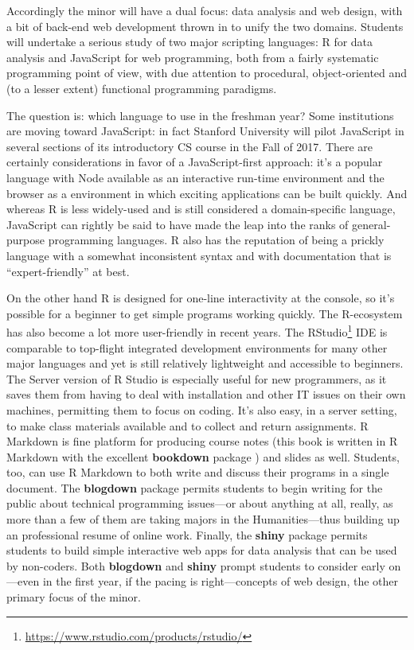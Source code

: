\documentclass[]{book}
\let\rmarkdownfootnote\footnote%
\def\footnote{\protect\rmarkdownfootnote}
\renewcommand{\href}[2]{#2\footnote{\url{#1}}}
\renewcommand{\href}[2]{#2\footnote{\url{#1}}}
\theoremstyle{definition}
\theoremstyle{definition}
\theoremstyle{definition}
\theoremstyle{remark}
\begin{document}
Accordingly the minor will have a dual focus: data analysis and web
design, with a bit of back-end web development thrown in to unify the
two domains. Students will undertake a serious study of two major
scripting languages: R for data analysis and JavaScript for web
programming, both from a fairly systematic programming point of view,
with due attention to procedural, object-oriented and (to a lesser
extent) functional programming paradigms.

The question is: which language to use in the freshman year? Some
institutions are moving toward JavaScript: in fact Stanford University
will pilot JavaScript in several sections of its introductory CS course
in the Fall of 2017. There are certainly considerations in favor of a
JavaScript-first approach: it's a popular language with Node available
as an interactive run-time environment and the browser as a environment
in which exciting applications can be built quickly. And whereas R is
less widely-used and is still considered a domain-specific language,
JavaScript can rightly be said to have made the leap into the ranks of
general-purpose programming languages. R also has the reputation of
being a prickly language with a somewhat inconsistent syntax and with
documentation that is ``expert-friendly'' at best.

On the other hand R is designed for one-line interactivity at the
console, so it's possible for a beginner to get simple programs working
quickly. The R-ecosystem has also become a lot more user-friendly in
recent years. The
\href{https://www.rstudio.com/products/rstudio/}{RStudio} IDE is
comparable to top-flight integrated development environments for many
other major languages and yet is still relatively lightweight and
accessible to beginners. The Server version of R Studio is especially
useful for new programmers, as it saves them from having to deal with
installation and other IT issues on their own machines, permitting them
to focus on coding. It's also easy, in a server setting, to make class
materials available and to collect and return assignments. R Markdown is
fine platform for producing course notes (this book is written in R
Markdown with the excellent \textbf{bookdown} package
\citep{R-bookdown}) and slides as well. Students, too, can use R
Markdown to both write and discuss their programs in a single document.
The \textbf{blogdown} package \citep{R-blogdown} permits students to
begin writing for the public about technical programming issues---or
about anything at all, really, as more than a few of them are taking
majors in the Humanities---thus building up an professional resume of
online work. Finally, the \textbf{shiny} package \citep{R-shiny} permits
students to build simple interactive web apps for data analysis that can
be used by non-coders. Both \textbf{blogdown} and \textbf{shiny} prompt
students to consider early on---even in the first year, if the pacing is
right---concepts of web design, the other primary focus of the minor.
\end{document}
